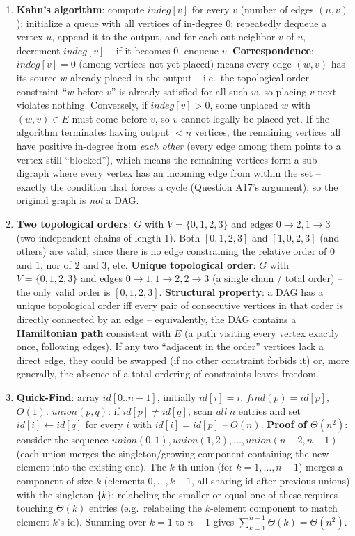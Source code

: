 \documentclass[11pt]{article}
\begin{document}
\begin{enumerate}[label=\textbf{A\arabic*.}, leftmargin=2.2em]
\item \textbf{Kahn's algorithm}: compute $indeg[v]$ for every $v$ (number of edges
$(u,v)$); initialize a queue with all vertices of in-degree 0; repeatedly dequeue a vertex
$u$, append it to the output, and for each out-neighbor $v$ of $u$, decrement $indeg[v]$
-- if it becomes 0, enqueue $v$. \textbf{Correspondence}: $indeg[v]=0$ (among vertices not
yet placed) means every edge $(w,v)$ has its source $w$ already placed in the output --
i.e.\ the topological-order constraint ``$w$ before $v$'' is already satisfied for all
such $w$, so placing $v$ next violates nothing. Conversely, if $indeg[v] > 0$, some
unplaced $w$ with $(w,v) \in E$ must come before $v$, so $v$ cannot legally be placed yet.
If the algorithm terminates having output $< n$ vertices, the remaining vertices all have
positive in-degree from \emph{each other} (every edge among them points to a vertex still
``blocked''), which means the remaining vertices form a sub-digraph where every vertex has
an incoming edge from within the set -- exactly the condition that forces a cycle
(Question A17's argument), so the original graph is \emph{not} a DAG.

\item \textbf{Two topological orders}: $G$ with $V=\{0,1,2,3\}$ and edges $0\to2,
1\to3$ (two independent chains of length 1). Both $[0,1,2,3]$ and $[1,0,2,3]$ (and others)
are valid, since there is no edge constraining the relative order of $0$ and $1$, nor of
$2$ and $3$, etc. \textbf{Unique topological order}: $G$ with $V=\{0,1,2,3\}$ and edges
$0\to1, 1\to2, 2\to3$ (a single chain / total order) -- the only valid order is
$[0,1,2,3]$. \textbf{Structural property}: a DAG has a unique topological order iff every
pair of consecutive vertices in that order is directly connected by an edge -- equivalently,
the DAG contains a \textbf{Hamiltonian path} consistent with $E$ (a path visiting every
vertex exactly once, following edges). If any two ``adjacent in the order'' vertices lack
a direct edge, they could be swapped (if no other constraint forbids it) or, more
generally, the absence of a total ordering of constraints leaves freedom.

\item \textbf{Quick-Find}: array $id[0..n-1]$, initially $id[i]=i$. $find(p) = id[p]$,
$O(1)$. $union(p,q)$: if $id[p] \ne id[q]$, scan \emph{all} $n$ entries and set
$id[i] \gets id[q]$ for every $i$ with $id[i]=id[p]$ -- $O(n)$. \textbf{Proof of
$\Theta(n^2)$}: consider the sequence $union(0,1), union(1,2), \dots, union(n-2,n-1)$ (each
union merges the singleton/growing component containing the new element into the existing
one). The $k$-th union (for $k=1,\dots,n-1$) merges a component of size $k$ (elements
$0,\dots,k-1$, all sharing id after previous unions) with the singleton $\{k\}$; relabeling
the smaller-or-equal one of these requires touching $\Theta(k)$ entries (e.g.\ relabeling
the $k$-element component to match element $k$'s id). Summing over $k=1$ to $n-1$ gives
$\sum_{k=1}^{n-1} \Theta(k) = \Theta(n^2)$.


\end{enumerate}
\end{document}
